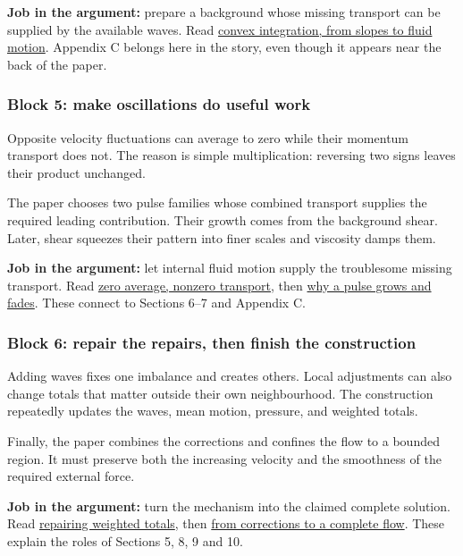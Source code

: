 \documentclass[
  english,
  11pt,
]{article}
\begin{document}
\textbf{Job in the argument:} prepare a background whose missing
transport can be supplied by the available waves. Read
\href{../convex-integration/article.html}{convex integration, from
slopes to fluid motion}. Appendix C belongs here in the story, even
though it appears near the back of the paper.

\subsubsection{Block 5: make oscillations do useful
work}\label{block-5-make-oscillations-do-useful-work}

Opposite velocity fluctuations can average to zero while their momentum
transport does not. The reason is simple multiplication: reversing two
signs leaves their product unchanged.

The paper chooses two pulse families whose combined transport supplies
the required leading contribution. Their growth comes from the
background shear. Later, shear squeezes their pattern into finer scales
and viscosity damps them.

\textbf{Job in the argument:} let internal fluid motion supply the
troublesome missing transport. Read
\href{../d4_mean_stress/article.html}{zero average, nonzero transport},
then \href{../d5_shearing_wave/article.html}{why a pulse grows and
fades}. These connect to Sections 6--7 and Appendix C.

\subsubsection{Block 6: repair the repairs, then finish the
construction}\label{block-6-repair-the-repairs-then-finish-the-construction}

Adding waves fixes one imbalance and creates others. Local adjustments
can also change totals that matter outside their own neighbourhood. The
construction repeatedly updates the waves, mean motion, pressure, and
weighted totals.

Finally, the paper combines the corrections and confines the flow to a
bounded region. It must preserve both the increasing velocity and the
smoothness of the required external force.

\textbf{Job in the argument:} turn the mechanism into the claimed
complete solution. Read
\href{../d6_moment_correction/article.html}{repairing weighted totals},
then \href{../completing-the-flow/article.html}{from corrections to a
complete flow}. These explain the roles of Sections 5, 8, 9 and 10.
\end{document}
